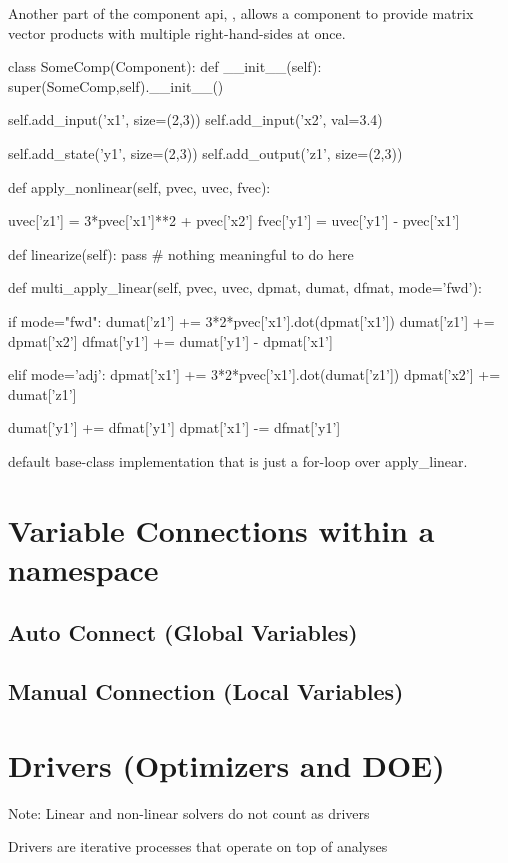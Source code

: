 \documentclass[12pt]{article}
\begin{document}
Another part of the component api, , allows a component
to provide matrix vector products with multiple right-hand-sides at once.

\begin{pyglist}[language=python]
    class SomeComp(Component):
        def __init__(self):
            super(SomeComp,self).__init__()

            self.add_input('x1', size=(2,3))
            self.add_input('x2', val=3.4)

            self.add_state('y1', size=(2,3))
            self.add_output('z1', size=(2,3))

        def apply_nonlinear(self, pvec, uvec, fvec):

            uvec['z1'] = 3*pvec['x1']**2 + pvec['x2']
            fvec['y1'] = uvec['y1'] - pvec['x1']

        def linearize(self):
            pass # nothing meaningful to do here

        def multi_apply_linear(self, pvec, uvec, dpmat, dumat, dfmat, mode='fwd'):

            if mode="fwd":
                dumat['z1'] += 3*2*pvec['x1'].dot(dpmat['x1'])
                dumat['z1'] += dpmat['x2']
                dfmat['y1'] += dumat['y1'] - dpmat['x1']

            elif mode='adj':
                dpmat['x1'] += 3*2*pvec['x1'].dot(dumat['z1'])
                dpmat['x2'] += dumat['z1']

                dumat['y1'] += dfmat['y1']
                dpmat['x1'] -= dfmat['y1']
\end{pyglist}

default base-class implementation that is just a for-loop over apply\_linear.

\section{Variable Connections within a namespace}
\subsection{Auto Connect (Global Variables)}
\subsection{Manual Connection (Local Variables)}

\section{Drivers  (Optimizers and DOE)}
Note: Linear and non-linear solvers do not count as drivers

Drivers are iterative processes that operate on top of analyses
\end{document}
